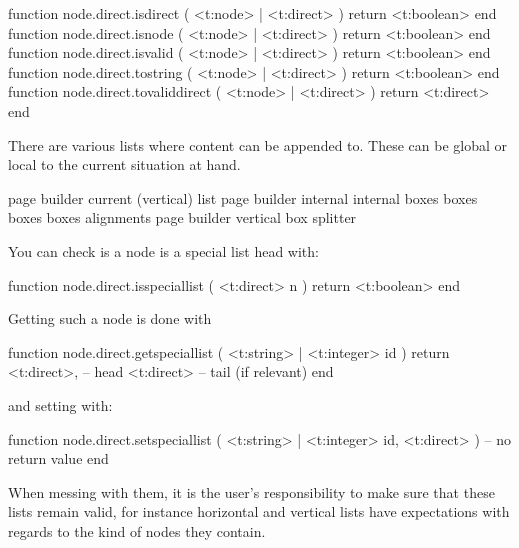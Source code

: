 \starttyping[option=LUA]
function node.direct.isdirect       ( <t:node> | <t:direct> ) return <t:boolean> end
function node.direct.isnode         ( <t:node> | <t:direct> ) return <t:boolean> end
function node.direct.isvalid        ( <t:node> | <t:direct> ) return <t:boolean> end
function node.direct.tostring       ( <t:node> | <t:direct> ) return <t:boolean> end
function node.direct.tovaliddirect  ( <t:node> | <t:direct> ) return <t:direct> end
\stoptyping

\stopsubsection

\startsubsection[title={Special lists}]

There are various lists where content can be appended to. These can be global or
local to the current situation at hand.

\startcolumns[n=2]
\starttabulate
\NC {}    \NC page builder \NC \NR
\NC {}    \NC current (vertical) list \NC \NR
\NC {}          \NC page builder \NC \NR
\NC {}          \NC internal \NC \NR
\NC {}          \NC internal \NC \NR
\NC {}    \NC boxes \NC \NR
\NC {}     \NC boxes \NC \NR
\NC {}   \NC boxes \NC \NR
\NC {}    \NC boxes \NC \NR
\NC {}         \NC alignments \NC \NR
\NC {}  \NC page builder \NC \NR
\NC {} \NC vertical box splitter \NC \NR
\stoptabulate
\stopcolumns

You can check is a node is a special list head with:

\starttyping[option=LUA]
function node.direct.isspeciallist (
    <t:direct> n
)
    return <t:boolean>
end
\stoptyping

Getting such a node is done with

\starttyping[option=LUA]
function node.direct.getspeciallist (
    <t:string> | <t:integer> id
)
    return
        <t:direct>, -- head
        <t:direct>  -- tail (if relevant)
end
\stoptyping

and setting with:

\starttyping[option=LUA]
function node.direct.setspeciallist (
    <t:string> | <t:integer> id,
    <t:direct>
)
    -- no return value
end
\stoptyping

When messing with them, it is the user's responsibility to make sure that these
lists remain valid, for instance horizontal and vertical lists have expectations
with regards to the kind of nodes they contain.

